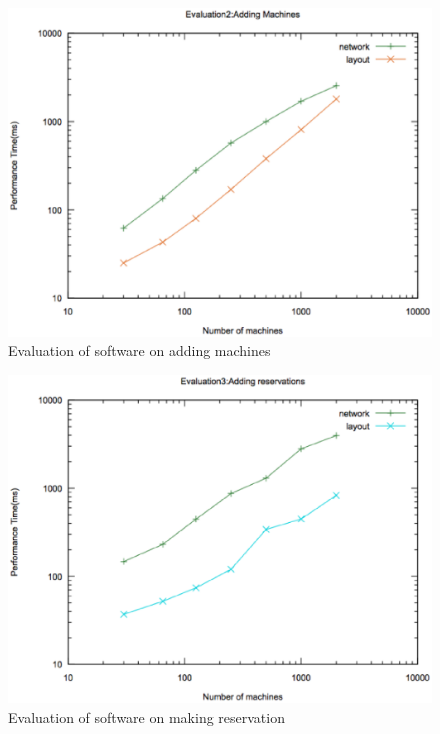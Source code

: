 \begin{figure}[h]
 \includegraphics[width=\linewidth]{addmachine.eps}
  \caption{Evaluation of software on adding machines}
  \label{addmachine}
\end{figure}

\begin{figure}[h]
 \includegraphics[width=\linewidth]{addreservation.eps}
  \caption{Evaluation of software on making reservation}
  \label{addreservation}
\end{figure}
